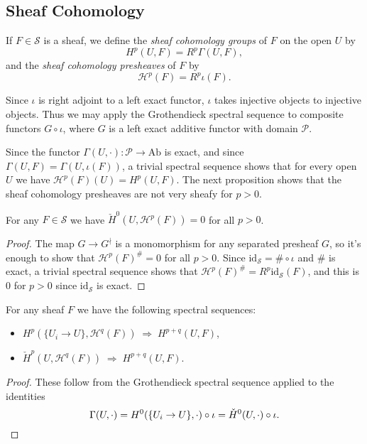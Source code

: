\subsection{Sheaf Cohomology}

\begin{defn} If $F\in\mathcal{S}$ is a sheaf, we define the \emph{sheaf cohomology groups} of $F$ on the open $U$ by
\[
H^p(U,F) = R^p\Gamma(U,F),
\]
and the \emph{sheaf cohomology presheaves} of $F$ by
\[
\mathcal{H}^p(F) = R^p\iota(F).
\]
\end{defn}

\begin{rem} Since $\iota$ is right adjoint to a left exact functor, $\iota$ takes injective objects to injective objects. Thus we may apply the Grothendieck spectral sequence to composite functors $G\circ\iota$, where $G$ is a left exact additive functor with domain $\mathcal{P}$.
\end{rem}

Since the functor $\Gamma(U,\cdot):\mathcal{P}\rightarrow \mbox{Ab}$ is exact, and since $\Gamma(U,F) = \Gamma(U,\iota(F))$, a trivial spectral sequence shows that for every open $U$ we have $\mathcal{H}^p(F)(U) = H^p(U,F)$. The next proposition shows that the sheaf cohomology presheaves are not very sheafy for $p > 0$.

\begin{prop}\label{not-sheafy} For any $F\in\mathcal{S}$ we have $\check{H}^0(U,\mathcal{H}^p(F)) = 0$ for all $p > 0$.
\end{prop}
\begin{proof} The map $G\rightarrow G^\nmid$ is a monomorphism for any separated presheaf $G$, so it's enough to show that $\mathcal{H}^p(F)^\# = 0$ for all $p > 0$. Since $\mbox{id}_\mathcal{S} = \#\circ\iota$ and $\#$ is exact, a trivial spectral sequence shows that $\mathcal{H}^p(F)^\# = R^p\mbox{id}_\mathcal{S}(F)$, and this is $0$ for $p>0$ since $\mbox{id}_\mathcal{S}$ is exact.
\end{proof}

\begin{thm}\label{cech-to-derived} For any sheaf $F$ we have the following spectral sequences:
\begin{itemize}
\item $H^p(\{U_i\rightarrow U\},\mathcal{H}^q(F)) \; \Rightarrow \; H^{p+q}(U,F)$,

\item $\check{H}^p(U,\mathcal{H}^q(F)) \; \Rightarrow \; H^{p+q}(U,F)$.
\end{itemize}
\end{thm}
\begin{proof} These follow from the Grothendieck spectral sequence applied to the identities
\[
\Gamma(U,\cdot) = H^0(\{U_i\rightarrow U\},\cdot)\circ\iota = \check{H}^0(U,\cdot)\circ\iota.\qedhere
\]
\end{proof}

